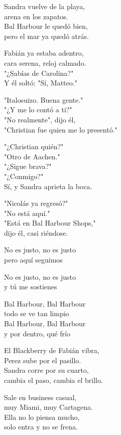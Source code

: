 \begin{lyrics}

Sandra vuelve de la playa,\\
arena en los zapatos.\\
Bal Harbour le quedó bien,\\
pero el mar ya quedó atrás.

Fabián ya estaba adentro,\\
cara serena, reloj calmado.\\
"¿Sabías de Carolina?"\\
Y él soltó: "Sí, Matteo."

"Italosuizo. %
Buena gente."\\
"¿Y me lo contó a ti?"\\
"No realmente", dijo él,\\
"Christian fue quien me lo presentó."

"¿Christian quién?"\\
"Otro de Aachen."\\
"¿Sigue brava?"\\
"¿Conmigo?"\\
Sí, y Sandra aprieta la boca.

"Nicolás ya regresó?"\\
"No está aquí."\\
"Está en Bal Harbour Shops,"\\
dijo él, casi riéndose.

No es justo, no es justo\\
pero aquí seguimos

No es justo, no es justo\\
y tú me sostienes

Bal Harbour, Bal Harbour\\
todo se ve tan limpio\\
Bal Harbour, Bal Harbour\\
y por dentro, qué frío

El Blackberry de Fabián vibra,\\
Perez sube por el pasillo.\\
Sandra corre por su cuarto,\\
cambia el paso, cambia el brillo.

Sale en business casual,\\
muy Miami, muy Cartagena.\\
Ella no lo piensa mucho,\\
solo entra y no se frena.


\end{lyrics}
